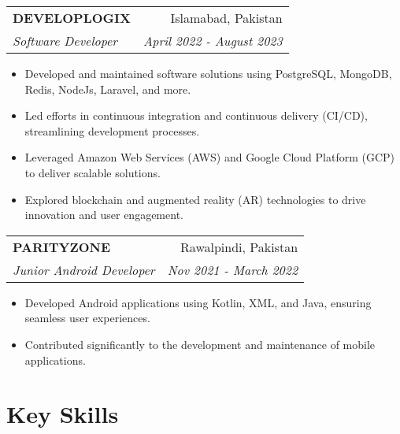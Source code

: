\documentclass[letterpaper,10.8pt]{article}
\makeatletter
\newcommand{\resumeSubheading}[4]{
  \vspace{-1pt}\item
    \begin{tabular*}{0.97\textwidth}{l@{\extracolsep{\fill}}r}
      \textbf{#1} & #2 \\
      \textit{\small#3} & \textit{\small #4} \\
    \end{tabular*}\vspace{-5pt}
}
\makeatother
\begin{document}
    \resumeSubheading
    {DEVELOPLOGIX}{Islamabad, Pakistan}
    {Software Developer}{April 2022 -  August 2023}
    \vspace{2pt}
   \begin{itemize}
    \item Developed and maintained software solutions using PostgreSQL, MongoDB, Redis, NodeJs, Laravel, and more.
    \item Led efforts in continuous integration and continuous delivery (CI/CD), streamlining development processes.
    \item Leveraged Amazon Web Services (AWS) and Google Cloud Platform (GCP) to deliver scalable solutions.
    \item Explored blockchain and augmented reality (AR) technologies to drive innovation and user engagement.
\end{itemize}
      
    \resumeSubheading
		{PARITYZONE}{Rawalpindi, Pakistan}
		{Junior Android Developer}{Nov 2021 -  March 2022}
	 \vspace{2pt}
    \begin{itemize}
    \item Developed Android applications using Kotlin, XML, and Java, ensuring seamless user experiences.
    \item Contributed significantly to the development and maintenance of mobile applications. 
    \end{itemize}




\section{Key Skills}
\end{document}
